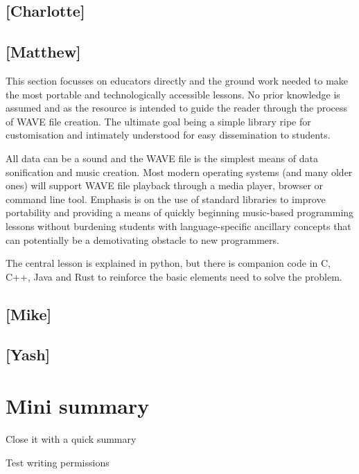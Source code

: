 \subsection{[Charlotte]}
% 

\subsection{[Matthew]}
This section focusses on educators directly and the ground work needed to make the most portable and technologically accessible lessons. No prior knowledge is assumed and as the resource is intended to guide the reader through the process of WAVE file creation. The ultimate goal being a simple library ripe for customisation and intimately understood for easy dissemination to students.

All data can be a sound and the WAVE file is the simplest means of data sonification and music creation. Most modern operating systems (and many older ones) will support WAVE file playback through a media player, browser or command line tool. Emphasis is on the use of standard libraries to improve portability and providing a means of quickly beginning music-based programming lessons without burdening students with language-specific ancillary concepts that can potentially be a demotivating obstacle to new programmers.

The central lesson is explained in python, but there is companion code in C, C++, Java and Rust to reinforce the basic elements need to solve the problem.

\subsection{[Mike]}

\subsection{[Yash]}


\section{Mini summary}
Close it with a quick summary

Test writing permissions
